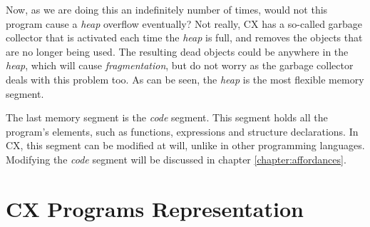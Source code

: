 \documentclass[11pt,fleqn,openany]{book} %
\begin{document}
Now, as we are doing this an indefinitely number of times, would not this program cause a \emph{heap} overflow eventually? Not really, CX has a so-called garbage collector that is activated each time the \emph{heap} is full, and removes the objects that are no longer being used. The resulting dead objects could be anywhere in the \emph{heap}, which will cause \emph{fragmentation}, but do not worry as the garbage collector deals with this problem too. As can be seen, the \emph{heap} is the most flexible memory segment.

The last memory segment is the \emph{code} segment. This segment holds all the program's elements, such as functions, expressions and structure declarations. In CX, this segment can be modified at will, unlike in other programming languages. Modifying the \emph{code} segment will be discussed in chapter \ref{chapter:affordances}.%


\chapter{CX Programs Representation}
\label{chapter:cx-programs-representation}

\end{document}
